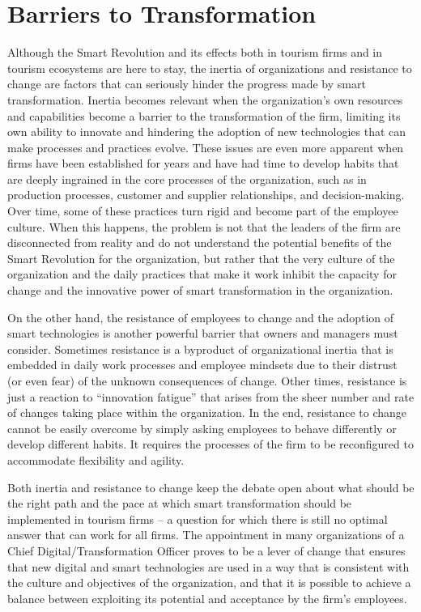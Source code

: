 \documentclass[
  letterpaper,
  DIV=11,
  numbers=noendperiod]{scrreprt}
\begin{document}
\hypertarget{barriers-to-transformation}{%
\section{Barriers to Transformation}\label{barriers-to-transformation}}

Although the Smart Revolution and its effects both in tourism firms and
in tourism ecosystems are here to stay, the inertia of organizations and
resistance to change are factors that can seriously hinder the progress
made by smart transformation. Inertia becomes relevant when the
organization's own resources and capabilities become a barrier to the
transformation of the firm, limiting its own ability to innovate and
hindering the adoption of new technologies that can make processes and
practices evolve. These issues are even more apparent when firms have
been established for years and have had time to develop habits that are
deeply ingrained in the core processes of the organization, such as in
production processes, customer and supplier relationships, and
decision-making. Over time, some of these practices turn rigid and
become part of the employee culture. When this happens, the problem is
not that the leaders of the firm are disconnected from reality and do
not understand the potential benefits of the Smart Revolution for the
organization, but rather that the very culture of the organization and
the daily practices that make it work inhibit the capacity for change
and the innovative power of smart transformation in the organization.

On the other hand, the resistance of employees to change and the
adoption of smart technologies is another powerful barrier that owners
and managers must consider. Sometimes resistance is a byproduct of
organizational inertia that is embedded in daily work processes and
employee mindsets due to their distrust (or even fear) of the unknown
consequences of change. Other times, resistance is just a reaction to
``innovation fatigue'' that arises from the sheer number and rate of
changes taking place within the organization. In the end, resistance to
change cannot be easily overcome by simply asking employees to behave
differently or develop different habits. It requires the processes of
the firm to be reconfigured to accommodate flexibility and agility.

Both inertia and resistance to change keep the debate open about what
should be the right path and the pace at which smart transformation
should be implemented in tourism firms -- a question for which there is
still no optimal answer that can work for all firms. The appointment in
many organizations of a Chief Digital/Transformation Officer proves to
be a lever of change that ensures that new digital and smart
technologies are used in a way that is consistent with the culture and
objectives of the organization, and that it is possible to achieve a
balance between exploiting its potential and acceptance by the firm's
employees.
\end{document}
